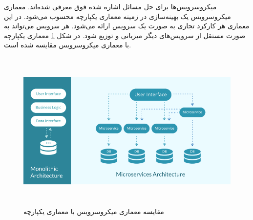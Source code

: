 میکروسرویس‌ها برای حل مسائل اشاره شده فوق معرفی شده‌اند. معماری میکروسرویس یک بهینه‌سازی در زمینه معماری یکپارچه محسوب می‌شود. در این معماری هر کارکرد تجاری به صورت یک سرویس ارائه می‌شود. هر سرویس می‌تواند به صورت مستقل از سرویس‌های دیگر میزبانی و توزیع شود. در شکل \ref{microservices} معماری یکپارچه با معماری میکروسرویس مقایسه شده است.

\begin{figure}[!h]
	\centering
	\includegraphics[height=8cm]{images/monolithic-vs-microservices}
	\caption{مقایسه معماری میکروسرویس با معماری یکپارچه}
	\label{microservices}
\end{figure}

